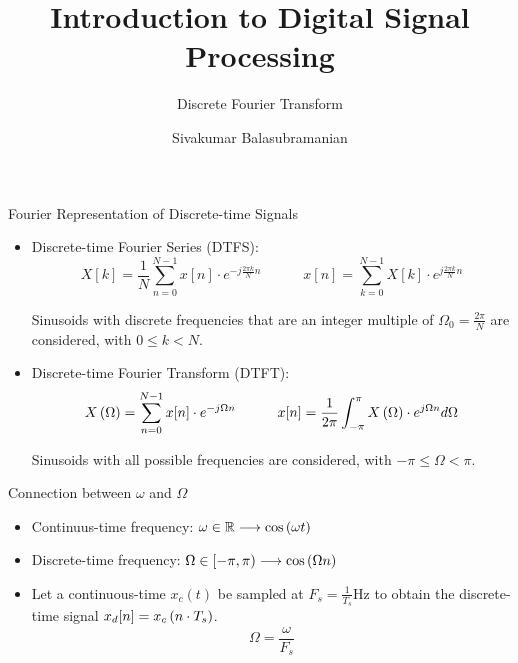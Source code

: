 \documentclass[aspectratio=169]{beamer}
\title{Introduction to Digital Signal Processing}
\subtitle{Discrete Fourier Transform}
\author{Sivakumar Balasubramanian}
\institute[Christian Medical College] %
{
  \inst{}%
  Department of Bioengineering\\
  Christian Medical College, Bagayam\\
  Vellore 632002
}
\date{}
\let\olditem\item
\renewcommand{\item}{\setlength{\itemsep}{\fill}\olditem}
\def\mb{\ensuremath\mathbb}
\def\lp{\ensuremath\left(}
\def\rp{\ensuremath\right)}
\begin{document}
\begin{frame}
  \titlepage
\end{frame}


\begin{frame}[t]{Fourier Representation of Discrete-time Signals}
\begin{itemize}
  \item Discrete-time Fourier Series (DTFS):
  \[ X[k] = \frac{1}{N}\sum_{n=0}^{N-1} x[n] \cdot e^{-j\frac{2\pi k}{N} n}  \quad \quad \quad x[n] = \sum_{k=0}^{N-1} X[k] \cdot e^{j\frac{2\pi k}{N} n} \]

  Sinusoids with discrete frequencies that are an integer multiple of $\Omega_0 = \frac{2\pi}{N}$ are considered, with $0 \leq k < N$.

  \item Discrete-time Fourier Transform (DTFT):
  \[ X\lp \Omega \rp = \sum_{n=0}^{N-1} x[n] \cdot e^{-j\Omega n}  \quad \quad \quad x[n] = \frac{1}{2\pi}\int_{-\pi}^{\pi} X\lp \Omega \rp \cdot e^{j\Omega n} d\Omega \]

  Sinusoids with all possible frequencies are considered, with $-\pi \leq \Omega < \pi$.
\end{itemize}
\end{frame}


\begin{frame}[t]{Connection between $\omega$ and $\Omega$}
\begin{itemize}
  \item Continuus-time frequency: $\omega \in \mb{R} \longrightarrow \cos\lp\omega t\rp$
  
  \item Discrete-time frequency: $\Omega \in [ -\pi, \pi )  \longrightarrow \cos\lp\Omega n\rp$

  \item Let a continuous-time $x_c(t)$ be sampled at $F_s = \frac{1}{T_s}$Hz to obtain the discrete-time signal $x_d[n] = x_c\lp n\cdot T_s\rp$.
  \[ \Omega = \frac{\omega}{F_s} \]
\end{itemize}
\end{frame}
\end{document}
